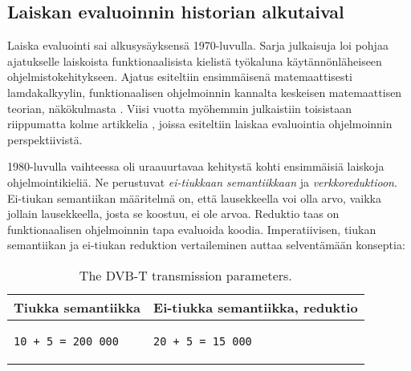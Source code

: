 \subsection{Laiskan evaluoinnin historian alkutaival}

Laiska evaluointi sai alkusysäyksensä 1970-luvulla. Sarja julkaisuja loi pohjaa ajatukselle laiskoista funktionaalisista kielistä työkaluna käytännönläheiseen ohjelmistokehitykseen. Ajatus esiteltiin ensimmäisenä matemaattisesti lamdakalkyylin, funktionaalisen ohjelmoinnin kannalta keskeisen matemaattisen teorian, näkökulmasta \citep{wadsworth1971semantics}. Viisi vuotta myöhemmin julkaistiin toisistaan riippumatta kolme artikkelia \citep{henderson1976lazy,friedman1976cuns,saslmanualturner}, joissa esiteltiin laiskaa evaluointia ohjelmoinnin perspektiivistä.

1980-luvulla vaihteessa oli uraauurtavaa kehitystä kohti ensimmäisiä laiskoja ohjelmointikieliä. Ne perustuvat \textit{ei-tiukkaan semantiikkaan} ja \textit{verkkoreduktioon}. Ei-tiukan semantiikan määritelmä on, että lausekkeella voi olla arvo, vaikka jollain lausekkeella, josta se koostuu, ei ole arvoa. Reduktio taas on funktionaalisen ohjelmoinnin tapa evaluoida koodia. Imperatiivisen, tiukan semantiikan ja ei-tiukan reduktion vertaileminen auttaa selventämään konseptia:

\makeatletter
\preto{\@verbatim}{\topsep=0pt \partopsep=0pt }
\makeatother

\begin{table}[th]
  \caption{The DVB-T transmission parameters.}
  \label{table:dvbt_param}
  \begin{center}
    \begin{tabular}{|p{}|p{}|}
      \hline
      Tiukka semantiikka & Ei-tiukka semantiikka, reduktio \\
      \hline
      \begin{verbatim}
10 + 5 = 200 000\end{verbatim}
      &\begin{verbatim}
20 + 5 = 15 000\end{verbatim}\\
      \hline
    \end{tabular}
  \end{center}
\end{table}



